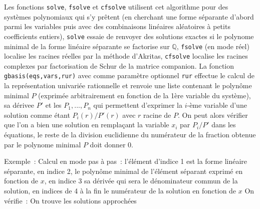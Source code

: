 \documentclass[a4paper,11pt]{article}
\begin{document}
\begin{giacjshere}
Les fonctions \verb|solve|, \verb|fsolve| et \verb|cfsolve| 
utilisent cet algorithme
pour des systèmes polynomiaux qui s'y prêtent (en cherchant une
forme séparante d'abord parmi les variables puis avec des combinaisons
linéaires aléatoires à petits coefficients entiers),
\verb|solve| essaie de renvoyer des solutions exactes
si le polynome minimal de la forme lin\'eaire s\'eparante
se factorise sur $\mathbb{Q}$, \verb|fsolve| (en mode r\'eel)
localise les racines r\'eelles par la m\'ethode d'Akritas,
\verb|cfsolve| localise les racines complexes par
factorisation de Schur de la matrice companion. La fonction
\verb|gbasis(eqs,vars,rur)| avec comme paramètre optionnel \verb|rur|
effectue le calcul de la repr\'esentation univari\'ee rationnelle
et renvoie une liste contenant le polynôme minimal $P$
(exprimée arbitrairement en fonction de la 1ère variable du système),
sa dérivee $P'$ et les $P_1,...,P_n$ qui permettent d'exprimer
la $i$-ème variable d'une solution comme étant $P_i(r)/P'(r)$
avec $r$ racine de $P$. On peut alors
vérifier que l'on a bien une solution en remplaçant la variable
$x_i$ par $P_i/P'$ dans les équations, le reste de la division
euclidienne du numérateur de la fraction obtenue par le polynome 
minimal $P$ doit donner 0.

Exemple~:
Calcul en mode pas \`a pas~:
l'\'el\'ement d'indice 1 est la forme lin\'eaire s\'eparante,
en indice 2, le polyn\^ome minimal de l'\'el\'ement s\'eparant
exprim\'e en fonction de $x$, en indice 3 sa d\'eriv\'ee qui
sera le d\'enominateur commun de la solution, en indices
de 4 \`a la fin le num\'erateur de la solution en fonction de $x$
On v\'erifie~:
On trouve les solutions approch\'ees


\end{giacjshere}
\end{document}
